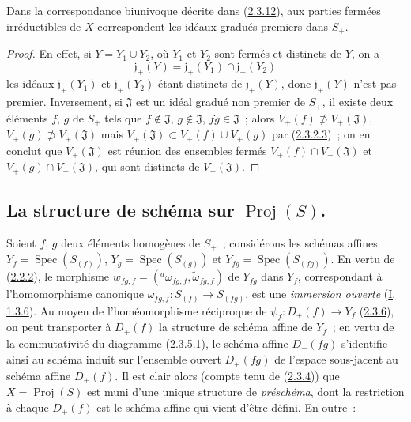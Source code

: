 \begin{corollary}[2.3.17]
\label{II.2.3.17-fr}
Dans la correspondance biunivoque décrite dans
(\hyperref[II.2.3.12-fr]{2.3.12}), aux parties fermées irréductibles de $X$
correspondent les idéaux gradués premiers dans $S_+$.
\end{corollary}

\begin{proof}
En effet, si $Y=Y_1\cup Y_2$, où $Y_1$ et $Y_2$ sont fermés et distincts de
$Y$, on a
\[
  \mathfrak{j}_+(Y)
  =\mathfrak{j}_+(Y_1)\cap\mathfrak{j}_+(Y_2)
\]
les idéaux $\mathfrak{j}_+(Y_1)$ et $\mathfrak{j}_+(Y_2)$ étant distincts
de $\mathfrak{j}_+(Y)$, donc $\mathfrak{j}_+(Y)$ n'est pas premier.
Inversement, si $\mathfrak{J}$ est un idéal gradué non premier de $S_+$, il
existe deux éléments $f$, $g$ de $S_+$ tels que
$f\notin\mathfrak{J}$, $g\notin\mathfrak{J}$, $fg\in\mathfrak{J}$~; alors
$V_+(f)\not\supset V_+(\mathfrak{J})$,
$V_+(g)\not\supset V_+(\mathfrak{J})$ mais
$V_+(\mathfrak{J})\subset V_+(f)\cup V_+(g)$ par
(\hyperref[II.2.3.2.3-fr]{2.3.2.3})~; on en conclut que
$V_+(\mathfrak{J})$ est réunion des ensembles fermés
$V_+(f)\cap V_+(\mathfrak{J})$ et $V_+(g)\cap V_+(\mathfrak{J})$, qui sont
distincts de $V_+(\mathfrak{J})$.
\end{proof}

\subsection{La structure de schéma sur $\operatorname{Proj}(S)$.}
\label{subsection:II.2.4-fr}

\begin{env}[2.4.1]
\label{II.2.4.1-fr}
Soient $f$, $g$ deux éléments homogènes de $S_+$~; considérons les schémas
affines $Y_f=\operatorname{Spec}(S_{(f)})$,
$Y_g=\operatorname{Spec}(S_{(g)})$ et
$Y_{fg}=\operatorname{Spec}(S_{(fg)})$. En vertu de
(\hyperref[II.2.2.2-fr]{2.2.2}), le morphisme
$w_{fg,f}=({}^a\omega_{fg,f},\widetilde{\omega}_{fg,f})$ de $Y_{fg}$ dans
$Y_f$, correspondant à l'homomorphisme canonique
$\omega_{fg,f}:S_{(f)}\to S_{(fg)}$, est une \emph{immersion ouverte}
(\hyperref[I.1.3.6-fr]{I, 1.3.6}). Au moyen de l'homéomorphisme réciproque
de $\psi_f:D_+(f)\to Y_f$ (\hyperref[II.2.3.6-fr]{2.3.6}), on peut
transporter à $D_+(f)$ la structure de schéma affine de $Y_f$~; en vertu de
la commutativité du diagramme (\hyperref[II.2.3.5.1-fr]{2.3.5.1}), le
schéma affine $D_+(fg)$ s'identifie ainsi au schéma induit sur l'ensemble
ouvert $D_+(fg)$ de l'espace sous-jacent au schéma affine $D_+(f)$. Il est
clair alors (compte tenu de (\hyperref[II.2.3.4-fr]{2.3.4})) que
$X=\operatorname{Proj}(S)$ est muni d'une unique structure de
\emph{préschéma}, dont la restriction à chaque $D_+(f)$ est le schéma
affine qui vient d'être défini. En outre~:
\end{env}

